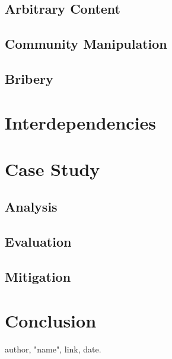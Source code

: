 \documentclass[11pt,a4paper,draft]{article}
\begin{document}
\subsection{Arbitrary Content}

\subsection{Community Manipulation}

\subsection{Bribery}

\section{Interdependencies}

\section{Case Study}

\subsection{Analysis}

\subsection{Evaluation}

\subsection{Mitigation}

\section{Conclusion}

\cite{item}

\begin{thebibliography}{9}

author,
"name",
link,
date.

\end{thebibliography}
\end{document}
